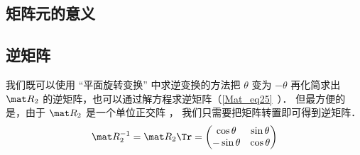 \subsection{矩阵元的意义}

\subsection{逆矩阵}
我们既可以使用 “平面旋转变换” 中求逆变换的方法把 $\theta$ 变为 $-\theta$ 再化简求出 $\mat R_2$ 的逆矩阵，也可以通过解方程求逆矩阵（\autoref{Mat_eq25}~）． 但最方便的是，由于 $\mat R_2$ 是一个单位正交阵%
， 我们只需要把矩阵转置即可得到逆矩阵．
\begin{equation}
\mat R_2^{-1} = \mat R_2\Tr = \begin{pmatrix}
\cos\theta &\sin\theta \\
-\sin\theta &\cos\theta
\end{pmatrix}
\end{equation}
